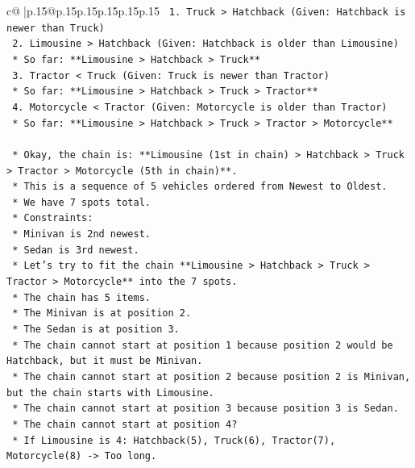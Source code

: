 \documentclass{article}
\begin{document}
{\begin{supertabular}{c@{$\;$}|p{.15\linewidth}@{}p{.15\linewidth}p{.15\linewidth}p{.15\linewidth}p{.15\linewidth}p{.15\linewidth}}
{{{\texttt{        1.  Truck > Hatchback (Given: Hatchback is newer than Truck)} \\
\texttt{        2.  Limousine > Hatchback (Given: Hatchback is older than Limousine)} \\
\texttt{            *   So far: **Limousine > Hatchback > Truck**} \\
\texttt{        3.  Tractor < Truck (Given: Truck is newer than Tractor)} \\
\texttt{            *   So far: **Limousine > Hatchback > Truck > Tractor**} \\
\texttt{        4.  Motorcycle < Tractor (Given: Motorcycle is older than Tractor)} \\
\texttt{            *   So far: **Limousine > Hatchback > Truck > Tractor > Motorcycle**} \\
\\ 
\texttt{    *   Okay, the chain is: **Limousine (1st in chain) > Hatchback > Truck > Tractor > Motorcycle (5th in chain)**.} \\
\texttt{    *   This is a sequence of 5 vehicles ordered from Newest to Oldest.} \\
\texttt{    *   We have 7 spots total.} \\
\texttt{    *   Constraints:} \\
\texttt{        *   Minivan is 2nd newest.} \\
\texttt{        *   Sedan is 3rd newest.} \\
\texttt{    *   Let's try to fit the chain **Limousine > Hatchback > Truck > Tractor > Motorcycle** into the 7 spots.} \\
\texttt{        *   The chain has 5 items.} \\
\texttt{        *   The Minivan is at position 2.} \\
\texttt{        *   The Sedan is at position 3.} \\
\texttt{        *   The chain cannot start at position 1 because position 2 would be Hatchback, but it must be Minivan.} \\
\texttt{        *   The chain cannot start at position 2 because position 2 is Minivan, but the chain starts with Limousine.} \\
\texttt{        *   The chain cannot start at position 3 because position 3 is Sedan.} \\
\texttt{        *   The chain cannot start at position 4?} \\
\texttt{            *   If Limousine is 4: Hatchback(5), Truck(6), Tractor(7), Motorcycle(8) {-}> Too long.} \\
}}}
\end{supertabular}}
\end{document}

